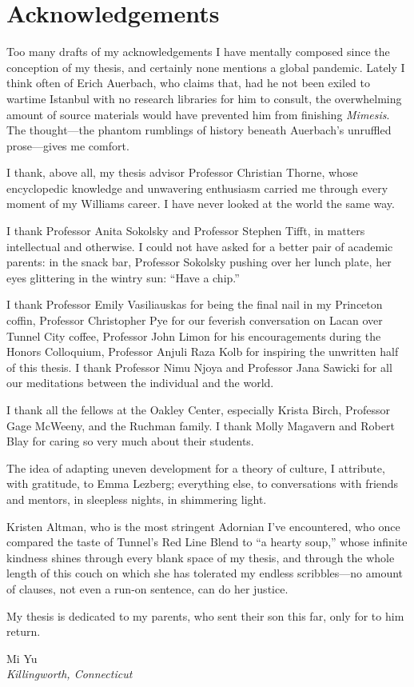 \chapter{Acknowledgements}

\begin{ack}

Too many drafts of my acknowledgements I have mentally composed since
the conception of my thesis, and certainly none mentions a global
pandemic. Lately I think often of Erich Auerbach, who claims that, had
he not been exiled to wartime Istanbul with no research libraries for
him to consult, the overwhelming amount of source materials would have
prevented him from finishing \emph{Mimesis}. The thought---the phantom
rumblings of history beneath Auerbach's unruffled prose---gives me
comfort.

I thank, above all, my thesis advisor Professor Christian Thorne, whose
encyclopedic knowledge and unwavering enthusiasm carried me through
every moment of my Williams career. I have never looked at the world the
same way.

I thank Professor Anita Sokolsky and Professor Stephen Tifft, in matters
intellectual and otherwise. I could not have asked for a better pair of
academic parents: in the snack bar, Professor Sokolsky pushing over her
lunch plate, her eyes glittering in the wintry sun: ``Have a chip.''

I thank Professor Emily Vasiliauskas for being the final nail in my Princeton
coffin, Professor Christopher Pye for our feverish conversation on Lacan over
Tunnel City coffee, Professor John Limon for his encouragements during the
Honors Colloquium, Professor Anjuli Raza Kolb for inspiring the unwritten half
of this thesis. I thank Professor Nimu Njoya and Professor Jana Sawicki for all
our meditations between the individual and the world.

I thank all the fellows at the Oakley Center, especially Krista Birch,
Professor Gage McWeeny, and the Ruchman family. I thank Molly Magavern
and Robert Blay for caring so very much about their students.

The idea of adapting uneven development for a theory of culture, I
attribute, with gratitude, to Emma Lezberg; everything else, to
conversations with friends and mentors, in sleepless nights, in
shimmering light.

Kristen Altman, who is the most stringent Adornian I've encountered, who
once compared the taste of Tunnel's Red Line Blend to ``a hearty soup,''
whose infinite kindness shines through every blank space of my thesis,
and through the whole length of this couch on which she has tolerated my
endless scribbles---no amount of clauses, not even a run-on sentence,
can do her justice.

My thesis is dedicated to my parents, who sent their son this far, only
for to him return.

\vspace{5\baselineskip}
\raggedleft
Mi Yu \\
\emph{Killingworth, Connecticut}

\end{ack}

